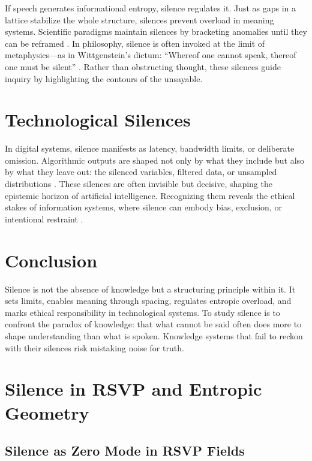 \documentclass{article}
\begin{document}
If speech generates informational entropy, silence regulates it. Just as gaps in a lattice stabilize the whole structure, silences prevent overload in meaning systems. Scientific paradigms maintain silences by bracketing anomalies until they can be reframed \citep{Kuhn1962}. In philosophy, silence is often invoked at the limit of metaphysics—as in Wittgenstein’s dictum: “Whereof one cannot speak, thereof one must be silent” \citep{Wittgenstein1961}. Rather than obstructing thought, these silences guide inquiry by highlighting the contours of the unsayable.

\section{Technological Silences}

In digital systems, silence manifests as latency, bandwidth limits, or deliberate omission. Algorithmic outputs are shaped not only by what they include but also by what they leave out: the silenced variables, filtered data, or unsampled distributions \citep{Gitelman2013}. These silences are often invisible but decisive, shaping the epistemic horizon of artificial intelligence. Recognizing them reveals the ethical stakes of information systems, where silence can embody bias, exclusion, or intentional restraint \citep{Benjamin2019}.

\section{Conclusion}

Silence is not the absence of knowledge but a structuring principle within it. It sets limits, enables meaning through spacing, regulates entropic overload, and marks ethical responsibility in technological systems. To study silence is to confront the paradox of knowledge: that what cannot be said often does more to shape understanding than what is spoken. Knowledge systems that fail to reckon with their silences risk mistaking noise for truth.

\appendix

\section{Silence in RSVP and Entropic Geometry} \label{app:A}

\subsection{Silence as Zero Mode in RSVP Fields}
\end{document}
